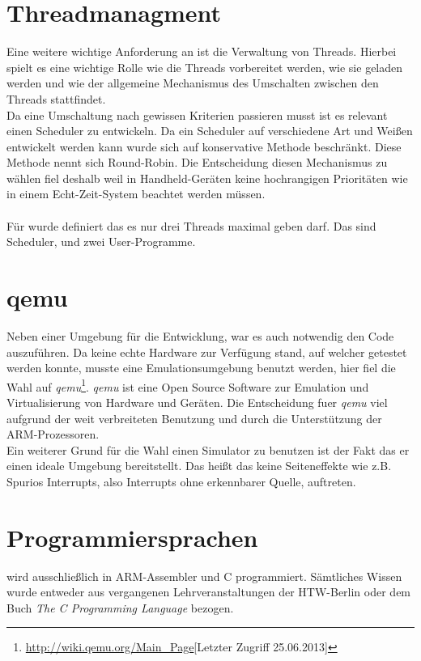 \section{Threadmanagment}
Eine weitere wichtige Anforderung an \mops ist die Verwaltung von Threads. Hierbei spielt es eine wichtige Rolle wie die Threads vorbereitet werden, wie sie geladen werden und wie der allgemeine Mechanismus des Umschalten zwischen den Threads stattfindet.\\
Da eine Umschaltung nach gewissen Kriterien passieren musst ist es relevant einen Scheduler zu entwickeln. Da ein Scheduler auf verschiedene Art und Wei\ss en entwickelt werden kann wurde sich auf konservative Methode beschr\"ankt. Diese Methode nennt sich Round-Robin. Die Entscheidung diesen Mechanismus zu w\"ahlen fiel deshalb weil in Handheld-Ger\"aten keine hochrangigen Priorit\"aten wie in einem Echt-Zeit-System beachtet werden m\"ussen.\\ \\
F\"ur \mops wurde definiert das es nur drei Threads maximal geben darf. Das sind Scheduler, und zwei User-Programme.
\section{qemu}
Neben einer Umgebung f\"ur die Entwicklung, war es auch notwendig den Code auszuf\"uhren. Da keine echte Hardware zur Verf\"ugung stand, auf welcher \mops getestet werden konnte, musste eine Emulationsumgebung benutzt werden, hier fiel die Wahl auf \textit{qemu}\footnote{\url{http://wiki.qemu.org/Main_Page}[Letzter Zugriff 25.06.2013]}. \textit{qemu} ist eine Open Source Software zur Emulation und Virtualisierung von Hardware und Ger\"aten. Die Entscheidung fuer \textit{qemu} viel aufgrund der weit verbreiteten Benutzung und durch die Unterst\"utzung der ARM-Prozessoren.\\
Ein weiterer Grund f\"ur die Wahl einen Simulator zu benutzen ist der Fakt das er einen ideale Umgebung bereitstellt. Das hei\ss t das keine Seiteneffekte wie z.B. Spurios Interrupts, also Interrupts ohne erkennbarer Quelle, auftreten.
\section{Programmiersprachen}
\mops wird ausschlie\ss lich in ARM-Assembler und C programmiert. S\"amtliches Wissen wurde entweder aus vergangenen Lehrveranstaltungen der HTW-Berlin oder dem Buch \textit{The C Programming Language}\parencite{clanguage} bezogen.
